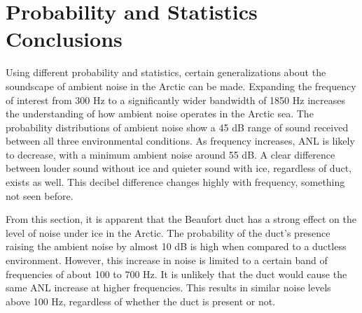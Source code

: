 \section{Probability and Statistics Conclusions}
Using different probability and statistics, certain generalizations about the soundscape of ambient noise in the Arctic can be made. Expanding the frequency of interest from 300 Hz to a significantly wider bandwidth of 1850 Hz increases the understanding of how ambient noise operates in the Arctic sea. The probability distributions of ambient noise show a 45 dB range of sound received between all three environmental conditions. As frequency increases, ANL is likely to decrease, with a minimum ambient noise around 55 dB. A clear difference between louder sound without ice and quieter sound with ice, regardless of duct, exists as well. This decibel difference changes highly with frequency, something not seen before.

From this section, it is apparent that the Beaufort duct has a strong effect on the level of noise under ice in the Arctic. The probability of the duct's presence raising the ambient noise by almost 10 dB is high when compared to a ductless environment. However, this increase in noise is limited to a certain band of frequencies of about 100 to 700 Hz. It is unlikely that the duct would cause the same ANL increase at higher frequencies. This results in similar noise levels above 100 Hz, regardless of whether the duct is present or not.

